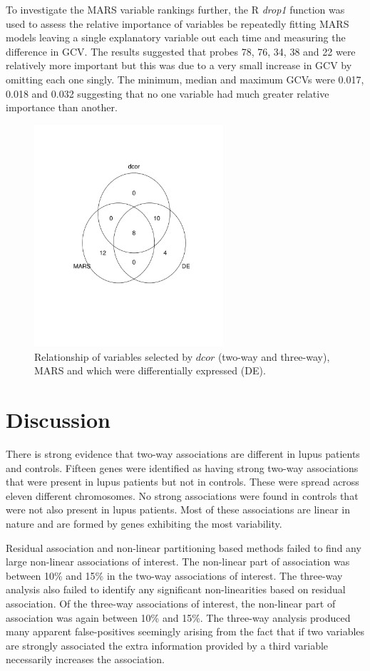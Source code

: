 \documentclass[a4paper, 12pt]{report}
\begin{document}
To investigate the MARS variable rankings further, the R \textit{drop1} function was used to assess the relative importance of variables be repeatedly fitting MARS models leaving a single explanatory variable out each time and measuring the difference in GCV. The results suggested that probes 78, 76, 34, 38 and 22 were relatively more important but this was due to a very small increase in GCV  by omitting each one singly. The minimum, median and maximum GCVs were 0.017, 0.018 and 0.032 suggesting that no one variable had much greater relative importance than another. 

\begin{figure}[H]
\begin{centering}
\includegraphics[width=7cm]{vennMARS.pdf}
\caption{Relationship of variables selected by $dcor$ (two-way and three-way), MARS and which were differentially expressed (\gls{DE}).} 
\label{F:vennMARS}
\end{centering}
\end{figure}


\section{Discussion}
There is strong evidence that two-way associations are different in lupus patients and controls. Fifteen genes were identified as having strong two-way associations that were present in lupus patients but not in controls. These were spread across eleven different chromosomes. No strong associations were found in controls that were not also present in lupus patients. Most of these associations are linear in nature and are formed by genes exhibiting the most variability. 

Residual association and non-linear partitioning based methods failed to find any large non-linear associations of interest. The non-linear part of association was between 10\% and 15\% in the two-way associations of interest. The three-way analysis also failed to identify any significant non-linearities based on residual association. Of the three-way associations of interest, the non-linear part of association was again between 10\% and 15\%. The three-way analysis produced many apparent false-positives seemingly arising from the fact that if two variables are strongly associated the extra information provided by a third variable necessarily increases the association.
\end{document}
